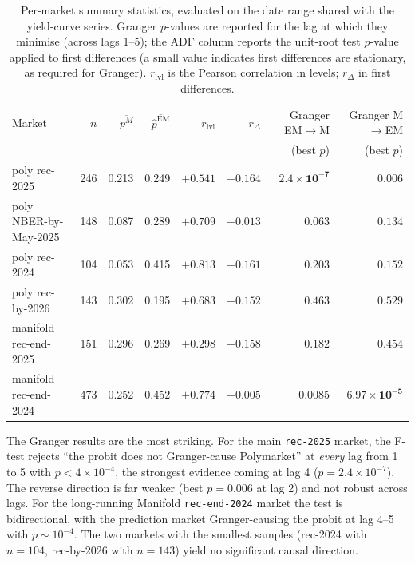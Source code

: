 \documentclass{article}
\begin{document}
\begin{table}[t]
\centering
\caption{Per-market summary statistics, evaluated on the date range shared with the yield-curve series. Granger $p$-values are reported for the lag at which they minimise (across lags 1--5); the ADF column reports the unit-root test $p$-value applied to first differences (a small value indicates first differences are stationary, as required for Granger). $r_\text{lvl}$ is the Pearson correlation in levels; $r_\Delta$ in first differences.}
\label{tab:percent}
\small
\setlength{\tabcolsep}{4pt}
\begin{tabular}{lrrrrrrr}
\toprule
Market & $n$ & $\overline{p^M}$ & $\overline{\hat p^\text{EM}}$ & $r_\text{lvl}$ & $r_\Delta$ & Granger EM$\to$M & Granger M$\to$EM \\
& & & & & & (best $p$) & (best $p$) \\
\midrule
poly rec-2025          & 246 & 0.213 & 0.249 & $+0.541$ & $-0.164$ & $\mathbf{2.4\!\times\!10^{-7}}$ & $0.006$ \\
poly NBER-by-May-2025  & 148 & 0.087 & 0.289 & $+0.709$ & $-0.013$ & $0.063$ & $0.134$ \\
poly rec-2024          & 104 & 0.053 & 0.415 & $+0.813$ & $+0.161$ & $0.203$ & $0.152$ \\
poly rec-by-2026       & 143 & 0.302 & 0.195 & $+0.683$ & $-0.152$ & $0.463$ & $0.529$ \\
manifold rec-end-2025  & 151 & 0.296 & 0.269 & $+0.298$ & $+0.158$ & $0.182$ & $0.454$ \\
manifold rec-end-2024  & 473 & 0.252 & 0.452 & $+0.774$ & $+0.005$ & $\mathbf{0.0085}$ & $\mathbf{6.97\!\times\!10^{-5}}$ \\
\bottomrule
\end{tabular}
\end{table}

The Granger results are the most striking. For the main \texttt{rec-2025} market, the F-test rejects ``the probit does not Granger-cause Polymarket'' at \emph{every} lag from 1 to 5 with $p < 4\!\times\!10^{-4}$, the strongest evidence coming at lag 4 ($p=2.4\!\times\!10^{-7}$). The reverse direction is far weaker (best $p=0.006$ at lag 2) and not robust across lags. For the long-running Manifold \texttt{rec-end-2024} market the test is bidirectional, with the prediction market Granger-causing the probit at lag 4--5 with $p\sim 10^{-4}$. The two markets with the smallest samples (rec-2024 with $n=104$, rec-by-2026 with $n=143$) yield no significant causal direction.
\end{document}
